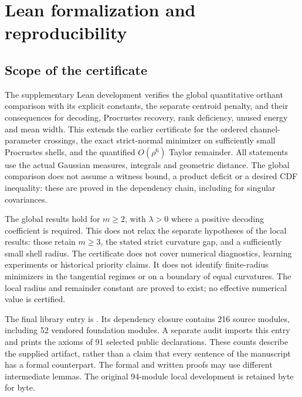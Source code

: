 \section{Lean formalization and reproducibility}\label{ap:lean}

\subsection{Scope of the certificate}\label{lv:scope}
The supplementary Lean development verifies the global quantitative
orthant comparison with its explicit constants, the separate centroid
penalty, and their consequences for decoding, Procrustes recovery, rank
deficiency, unused energy and mean width.  This extends the earlier
certificate for the ordered channel-parameter crossings, the exact
strict-normal minimizer on sufficiently small Procrustes shells, and the
quantified $O(\rho^6)$ Taylor remainder.  All statements use the actual
Gaussian measures, integrals and geometric distance.  The global
comparison does not assume a witness bound, a product deficit or a
desired CDF inequality: these are proved in the dependency chain,
including for singular covariances.

The global results hold for $m\ge2$, with $\lambda>0$ where a positive
decoding coefficient is required.  This does not relax the separate
hypotheses of the local results: those retain $m\ge3$, the stated strict
curvature gap, and a sufficiently small shell radius.  The certificate
does not cover numerical diagnostics, learning experiments or historical
priority claims.  It does not identify finite-radius minimizers in the
tangential regimes or on a boundary of equal curvatures.  The local
radius and remainder constant are proved to exist; no effective numerical
value is certified.

The final library entry is .
Its dependency closure contains 216 source modules, including
52 vendored foundation modules.  A separate audit imports this entry
and prints the axioms of 91 selected public declarations.
These counts describe the supplied artifact, rather than a claim that
every sentence of the manuscript has a formal counterpart.  The formal
and written proofs may use different intermediate lemmas.
The original 94-module local development is retained byte for byte.

